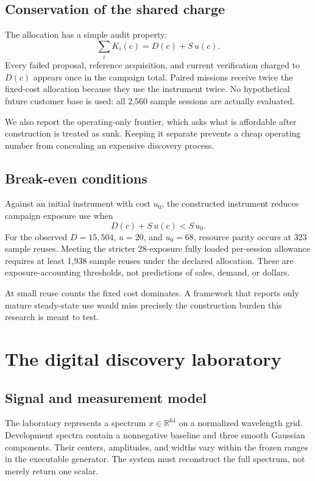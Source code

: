 \documentclass[11pt,a4paper]{article}
\begin{document}
\subsection{Conservation of the shared charge}

The allocation has a simple audit property:
\begin{equation}
\sum_iK_i(c)=D(c)+S\,u(c).
\label{eq:conservation}
\end{equation}
Every failed proposal, reference acquisition, and current verification charged to \(D(c)\) appears once in the campaign total. Paired missions receive twice the fixed-cost allocation because they use the instrument twice. No hypothetical future customer base is used: all 2,560 sample sessions are actually evaluated.

We also report the operating-only frontier, which asks what is affordable after construction is treated as sunk. Keeping it separate prevents a cheap operating number from concealing an expensive discovery process.

\subsection{Break-even conditions}

Against an initial instrument with cost \(u_0\), the constructed instrument reduces campaign exposure use when
\[
D(c)+S\,u(c)<S\,u_0.
\]
For the observed \(D=15{,}504\), \(u=20\), and \(u_0=68\), resource parity occurs at 323 sample reuses. Meeting the stricter 28-exposure fully loaded per-session allowance requires at least 1,938 sample reuses under the declared allocation. These are exposure-accounting thresholds, not predictions of sales, demand, or dollars.

At small reuse counts the fixed cost dominates. A framework that reports only mature steady-state use would miss precisely the construction burden this research is meant to test.

\section{The digital discovery laboratory}

\subsection{Signal and measurement model}

The laboratory represents a spectrum \(x\in\mathbb R^{64}\) on a normalized wavelength grid. Development spectra contain a nonnegative baseline and three smooth Gaussian components. Their centers, amplitudes, and widths vary within the frozen ranges in the executable generator. The system must reconstruct the full spectrum, not merely return one scalar.
\end{document}

